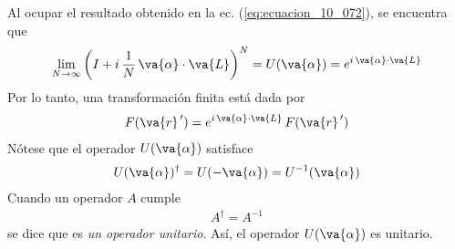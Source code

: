 Al ocupar el resultado obtenido en la ec. (\ref{eq:ecuacion_10_072}), se encuentra que
\begin{align}
\lim_{N \to \infty} \left( I + i \, \dfrac{1}{N} \, \va{\alpha} \cdot \va{L} \right)^{N} = U(\va{\alpha}) = e^{i \, \va{\alpha} \cdot \va{L}}
\label{eq:ecuacion_10_100}
\end{align}
Por lo tanto, una transformación finita está dada por
\begin{align}
F(\va{r}^{\, \prime}) = e^{i \, \va{\alpha} \cdot \va{L}} \, F(\va{r}^{\, \prime})
\label{eq:ecuacion_10_101}
\end{align}
Nótese que el operador $U(\va{\alpha})$ satisface
\begin{align}
U(\va{\alpha})^{\dagger} = U(- \va{\alpha}) = U^{-1} (\va{\alpha})
\label{eq:ecuacion_10_102}
\end{align}
Cuando un operador $A$ cumple
\begin{align*}
A^{\dagger} = A^{-1}
\end{align*}
se dice que es \emph{un operador unitario}. Así, el operador $U(\va{\alpha})$ es unitario.
